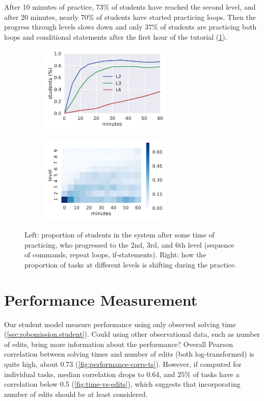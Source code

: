 After 10 minutes of practice, 73\% of students have reached the second level,
and after 20 minutes, nearly 70\% of students have started practicing loops.
Then the progress through levels slows down and only 37\% of students
are practicing both loops and conditional statements after the first
hour of the tutorial (\cref{fig:students-at-levels}).

\begin{figure}[htb]
\centering
\begin{subfigure}{.49\textwidth}
\centering
\includegraphics[height=42mm]{img/students-at-levels}
\end{subfigure}
\begin{subfigure}{.49\textwidth}
\centering
\includegraphics[height=42mm]{img/task-sessions-at-levels}
\end{subfigure}
\caption{%
  Left: proportion of students in the system after some time of practicing,
  who progressed to the 2nd, 3rd, and 6th level (sequence of commands, repeat loops, if-statements).
  Right: how the proportion of tasks at different levels is shifting during the practice.}
\label{fig:students-at-levels}
\end{figure}

\section{Performance Measurement}

Our student model measure %
performance using only observed solving time
(\cref{sec:robomission.student}).
Could using other observational data, such as number of edits,
bring more information about the performance?
Overall Pearson correlation between solving times and number of edits (both
log-transformed) is quite high, about 0.73 (\cref{fig:performance-corrs-ts}).
However, if computed for individual tasks,
median correlation drops to 0.64, %
and $25\%$ of tasks have a correlation below 0.5 %
(\cref{fig:time-vs-edits}), which suggests that incorporating number of edits should be
at least considered.

